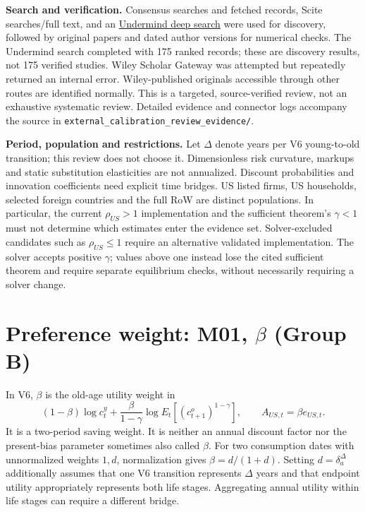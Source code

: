 \documentclass[10pt,a4paper,landscape]{article}
\newcommand{\code}[1]{{\small\texttt{#1}}}
\begin{document}
\textbf{Search and verification.}
Consensus searches and fetched records, Scite searches/full text, and an
\href{https://app.undermind.ai/projects/6513b93c-0aaf-4fd9-9554-e57b8db4a0cf?path=/External\%20calibration\%20of\%20V6\%20preferences\%20and\%20production}{Undermind deep search}
were used for discovery, followed by original papers and dated author versions for numerical checks.
The Undermind search completed with 175 ranked records; these are discovery results, not 175 verified studies.
Wiley Scholar Gateway was attempted but repeatedly returned an internal error.
Wiley-published originals accessible through other routes are identified normally.
This is a targeted, source-verified review, not an exhaustive systematic review.
Detailed evidence and connector logs accompany the source in
\code{external\_calibration\_review\_evidence/}.

\textbf{Period, population and restrictions.}
Let $\Delta$ denote years per V6 young-to-old transition; this review does not choose it.
Dimensionless risk curvature, markups and static substitution elasticities are not
annualized. Discount probabilities and innovation coefficients need explicit time bridges.
US listed firms, US households, selected foreign countries and the full RoW are distinct
populations. In particular, the current $\rho_{US}>1$ implementation and the sufficient
theorem's $\gamma<1$ must not determine which estimates enter the evidence set.
Solver-excluded candidates such as $\rho_{US}\le1$ require an alternative validated
implementation. The solver accepts positive $\gamma$; values above one instead lose
the cited sufficient theorem and require separate equilibrium checks, without necessarily
requiring a solver change.


\clearpage
\section[Preference weight: M01, beta (Group B)]{Preference weight: M01, $\beta$ (Group B)}

In V6, $\beta$ is the old-age utility weight in
\[
 (1-\beta)\log c_t^y+
 \frac{\beta}{1-\gamma}\log E_t[(c_{t+1}^o)^{1-\gamma}],
 \qquad A_{US,t}=\beta e_{US,t}.
\]
It is a two-period saving weight. It is neither an annual discount factor nor the
present-bias parameter sometimes also called $\beta$.
For two consumption dates with unnormalized weights $1,d$, normalization gives
$\beta=d/(1+d)$. Setting $d=\delta_a^\Delta$ additionally assumes that one V6
transition represents $\Delta$ years and that endpoint utility appropriately
represents both life stages. Aggregating annual utility within life stages can
require a different bridge.
\end{document}
